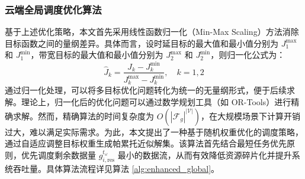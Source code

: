 \subsubsection{云端全局调度优化算法}

基于上述优化策略，本文首先采用线性函数归一化（Min-Max Scaling）方法消除目标函数之间的量纲差异。具体而言，设时延目标的最大值和最小值分别为 $J_1^{\max}$ 和 $J_1^{\min}$，带宽目标的最大值和最小值分别为 $J_2^{\max}$ 和 $J_2^{\min}$，则归一化公式为：
\[
\hat{J}_k = \frac{J_k - J_k^{\min}}{J_k^{\max} - J_k^{\min}},\quad k=1,2
\]
通过归一化处理，可以将多目标优化问题转化为统一的无量纲形式，便于后续求解。理论上，归一化后的优化问题可以通过数学规划工具（如 OR-Tools\cite{google_or_tools}）进行精确求解。然而，精确算法的时间复杂度为 $O(|\mathcal{F}_g|^{|\mathcal{V}|})$，在大规模场景下计算开销过大，难以满足实际需求。为此，本文提出了一种基于随机权重优化的调度策略，通过自适应调整目标权重生成帕累托近似解集。该算法首先结合最短任务优先原则，优先调度剩余数据量 $g_{i,\text{res}}^{t_\omega}$ 最小的数据流，从而有效降低资源碎片化并提升系统吞吐量。具体算法流程详见算法 \ref{alg:enhanced_global}。

